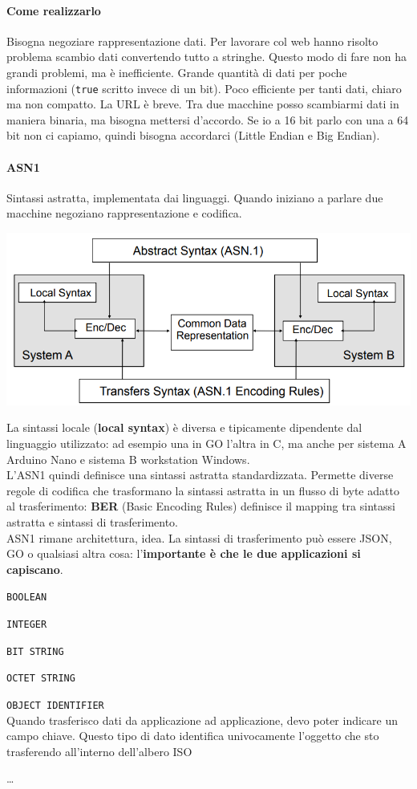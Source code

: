 \documentclass[10pt]{book}
\begin{document}
\paragraph{Come realizzarlo} Bisogna negoziare rappresentazione dati. Per lavorare col web hanno risolto problema scambio dati convertendo tutto a stringhe. Questo modo di fare non ha grandi problemi, ma è inefficiente. Grande quantità di dati per poche informazioni (\texttt{true} scritto invece di un bit). Poco efficiente per tanti dati, chiaro ma non compatto. La URL è breve. Tra due macchine posso scambiarmi dati in maniera binaria, ma bisogna mettersi d'accordo. Se io a 16 bit parlo con una a 64 bit non ci capiamo, quindi bisogna accordarci (Little Endian e Big Endian).
\paragraph{ASN1} Sintassi astratta, implementata dai linguaggi. Quando iniziano a parlare due macchine negoziano rappresentazione e codifica.
\begin{center}
	\includegraphics[scale=0.7]{asn1.png}
\end{center}
La sintassi locale (\textbf{local syntax}) è diversa e tipicamente dipendente dal linguaggio utilizzato: ad esempio una in GO l'altra in C, ma anche per sistema A Arduino Nano e sistema B workstation Windows.\\
L'ASN1 quindi definisce una sintassi astratta standardizzata. Permette diverse regole di codifica che trasformano la sintassi astratta in un flusso di byte adatto al trasferimento: \textbf{BER} (Basic Encoding Rules) definisce il mapping tra sintassi astratta e sintassi di trasferimento.\\
ASN1 rimane architettura, idea. La sintassi di trasferimento può essere JSON, GO o qualsiasi altra cosa: l'\textbf{importante è che le due applicazioni si capiscano}.
\begin{list}{}{I \textbf{tipi di dato} (datatypes) primitivi dell'ASN1 sono:}
	\item \texttt{BOOLEAN}
	\item \texttt{INTEGER}
	\item \texttt{BIT STRING}
	\item \texttt{OCTET STRING}
	\item \texttt{OBJECT IDENTIFIER}\\
	Quando trasferisco dati da applicazione ad applicazione, devo poter indicare un campo chiave. Questo tipo di dato identifica univocamente l'oggetto che sto trasferendo all'interno dell'albero ISO
	\item \ldots
\end{list}
\end{document}
